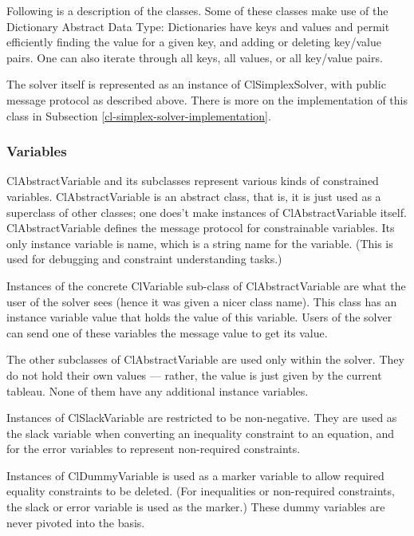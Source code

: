 \documentclass{article}
\begin{document}
Following is a description of the classes.  Some of these classes make
use of the Dictionary Abstract Data Type: Dictionaries have keys and
values and permit efficiently finding the value
for a given key, and adding or deleting key/value pairs.  One can also
iterate through all keys, all values, or all key/value pairs.

The solver itself is represented as an instance of {\sf ClSimplexSolver},
with public message protocol as described above.  There is more on the
implementation of this class in Subsection 
\ref{cl-simplex-solver-implementation}.

\subsubsection{Variables}

{\sf ClAbstractVariable} and its subclasses represent various kinds of
constrained variables.  {\sf ClAbstractVariable} is an abstract class, that
is, it is just used as a superclass of other classes; one does't make
instances of {\sf ClAbstractVariable} itself.  {\sf ClAbstractVariable}
defines the message protocol for constrainable variables.  Its only
instance variable is {\sf name}, which is a string name for the variable.
(This is used for debugging and constraint understanding tasks.)

Instances of the concrete {\sf ClVariable} sub-class of {\sf
  ClAbstractVariable} are what the user of the solver sees (hence
it was given a nicer class name).  This class has an instance variable
{\sf value} that holds the value of this variable.  Users of the solver can
send one of these variables the message {\sf value} to get its value.

The other subclasses of {\sf ClAbstractVariable} are used only within the
solver.  They do not hold their own values --- rather, the value is just
given by the current tableau.  None of them have any additional instance
variables.

Instances of {\sf ClSlackVariable} are restricted to be non-negative.  They
are used as the slack variable when converting an inequality constraint to
an equation, and for the error variables to represent non-required constraints.

Instances of {\sf ClDummyVariable} is used as a marker variable to allow
required equality constraints to be deleted.  (For inequalities or
non-required constraints, the slack or error variable is used as the
marker.)  These dummy variables are never pivoted into the basis.
\end{document}
